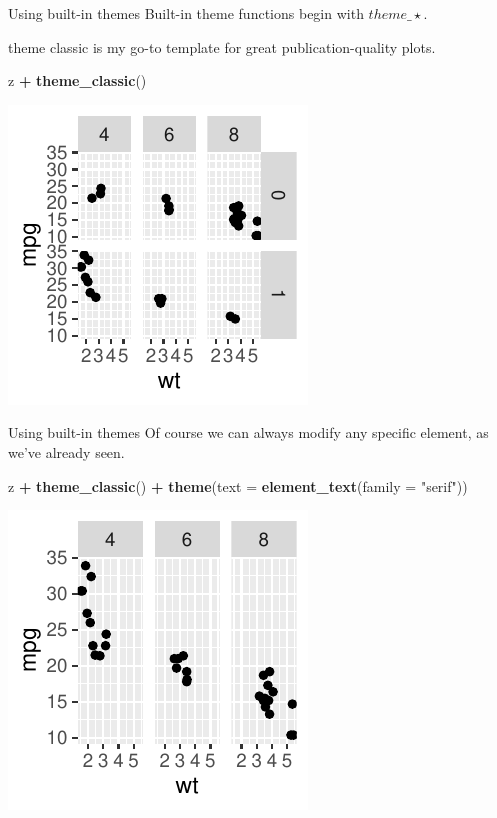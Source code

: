 \documentclass[
  ignorenonframetext,
]{beamer}
\newenvironment{Shaded}{\begin{snugshade}}{\end{snugshade}}
\newcommand{\AttributeTok}[1]{\textcolor[rgb]{0.13,0.29,0.53}{#1}}
\newcommand{\FunctionTok}[1]{\textcolor[rgb]{0.13,0.29,0.53}{\textbf{#1}}}
\newcommand{\NormalTok}[1]{#1}
\newcommand{\SpecialCharTok}[1]{\textcolor[rgb]{0.81,0.36,0.00}{\textbf{#1}}}
\newcommand{\StringTok}[1]{\textcolor[rgb]{0.31,0.60,0.02}{#1}}
\begin{document}
\begin{frame}[fragile]{Using built-in themes}
\label{using-built-in-themes}
Built-in theme functions begin with \(theme\_\star\).

theme classic is my go-to template for great publication-quality plots.

\begin{Shaded}
\begin{Highlighting}[]
\NormalTok{z }\SpecialCharTok{+} \FunctionTok{theme\_classic}\NormalTok{()}
\end{Highlighting}
\end{Shaded}

\begin{center}\includegraphics[width=0.5\linewidth]{Figs/unnamed-chunk-81-1} \end{center}
\end{frame}

\begin{frame}[fragile]{Using built-in themes}
\label{using-built-in-themes-1}
Of course we can always modify any specific element, as we've already
seen.


\begin{Shaded}
\begin{Highlighting}[]
\NormalTok{z }\SpecialCharTok{+} \FunctionTok{theme\_classic}\NormalTok{() }\SpecialCharTok{+} \FunctionTok{theme}\NormalTok{(}\AttributeTok{text =} \FunctionTok{element\_text}\NormalTok{(}\AttributeTok{family =} \StringTok{"serif"}\NormalTok{))}
\end{Highlighting}
\end{Shaded}

\begin{center}\includegraphics[width=0.5\linewidth]{Figs/unnamed-chunk-82-1} \end{center}
\end{frame}
\end{document}
